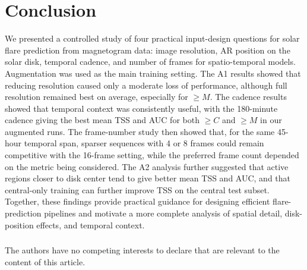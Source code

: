 \documentclass[runningheads]{llncs}
\begin{document}


\section{Conclusion}


We presented a controlled study of four practical input-design questions for solar flare prediction from magnetogram data: image resolution, AR position on the solar disk, temporal cadence, and number of frames for spatio-temporal models. Augmentation was used as the main training setting. The A1 results showed that reducing resolution caused only a moderate loss of performance, although full resolution remained best on average, especially for $\geq M$. The cadence results showed that temporal context was consistently useful, with the 180-minute cadence giving the best mean TSS and AUC for both $\geq C$ and $\geq M$ in our augmented runs. The frame-number study then showed that, for the same 45-hour temporal span, sparser sequences with 4 or 8 frames could remain competitive with the 16-frame setting, while the preferred frame count depended on the metric being considered. The A2 analysis further suggested that active regions closer to disk center tend to give better mean TSS and AUC, and that central-only training can further improve TSS on the central test subset. Together, these findings provide practical guidance for designing efficient flare-prediction pipelines and motivate a more complete analysis of spatial detail, disk-position effects, and temporal context.

\begin{credits}
\subsubsection{\discintname}
The authors have no competing interests to declare that are relevant to the content of this article.
\end{credits}
\end{document}
